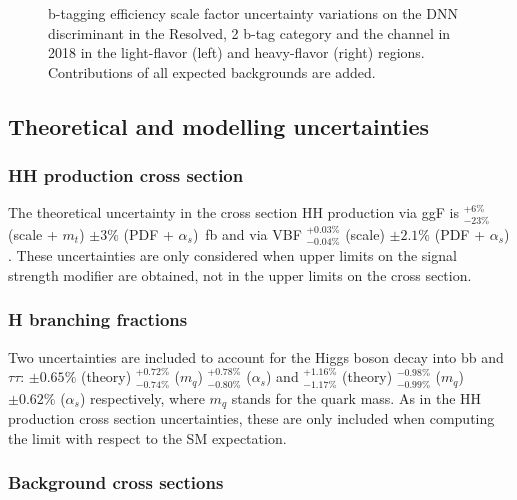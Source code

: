 \documentclass[../main.tex]{subfiles}
\begin{document}
\begin{figure}[h!]
\begin{center}
\end{center}
\caption[b-tagging efficiency scale factor uncertainties]{b-tagging efficiency scale factor uncertainty variations on the DNN discriminant in the Resolved, 2 b-tag category and the \tauh\tauh{} channel in 2018 in the light-flavor (left) and heavy-flavor (right) regions. Contributions of all expected backgrounds are added.}
\label{hh:fig:btag_syst}
\end{figure}


\subsection*{Theoretical and modelling uncertainties}

\subsubsection*{HH production cross section}

The theoretical uncertainty in the cross section HH production via ggF is ${}^{+6\%}_{-23\%}$ (scale + $m_t$) $\pm 3\%$ (PDF + $\alpha_s$)~fb \cite{hh:results:ggf_xs} and via VBF ${}^{+0.03\%}_{-0.04\%}$ (scale) $\pm 2.1\%$ (PDF + $\alpha_s$) \cite{hh:results:vbf_xs}. These uncertainties are only considered when upper limits on the signal strength modifier are obtained, not in the upper limits on the cross section.

\subsubsection*{H branching fractions}

Two uncertainties are included to account for the Higgs boson decay \cite{hh:results:h_bf} into bb and $\tau\tau$: $\pm 0.65\%$ (theory) ${}^{+0.72\%}_{-0.74\%}$ ($m_q$) ${}^{+0.78\%}_{-0.80\%}$ ($\alpha_s$) and 
${}^{+1.16\%}_{-1.17\%}$  (theory) ${}^{-0.98\%}_{-0.99\%}$ ($m_q$) $\pm 0.62\%$ ($\alpha_s$) respectively, where $m_q$ stands for the quark mass. As in the HH production cross section uncertainties, these are only included when computing the limit with respect to the SM expectation.

\subsubsection*{Background cross sections}
\end{document}
